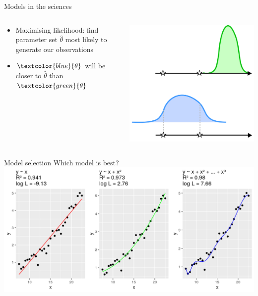 \documentclass[10pt]{beamer}
\begin{document}
\begin{frame}{Models in the sciences}
  \begin{columns}
    \begin{column}{0.34\textwidth}
  \begin{itemize}
  \item Maximising likelihood: find parameter set $\hat{\theta}$ most likely to generate our observations
    \item $\textcolor{blue}{\theta}$ will be closer to $\hat{\theta}$ than $\textcolor{green}{\theta}$
  \end{itemize}
    \end{column}
    \begin{column}{0.65\textwidth}
          \includegraphics[width=\textwidth]{camria-lik.png}
    \end{column}
        \end{columns}
\end{frame}

\begin{frame}{Model selection}
  Which model is best?
  \includegraphics[width=\textwidth]{cedas-model-3.png}
\end{frame}
\end{document}
